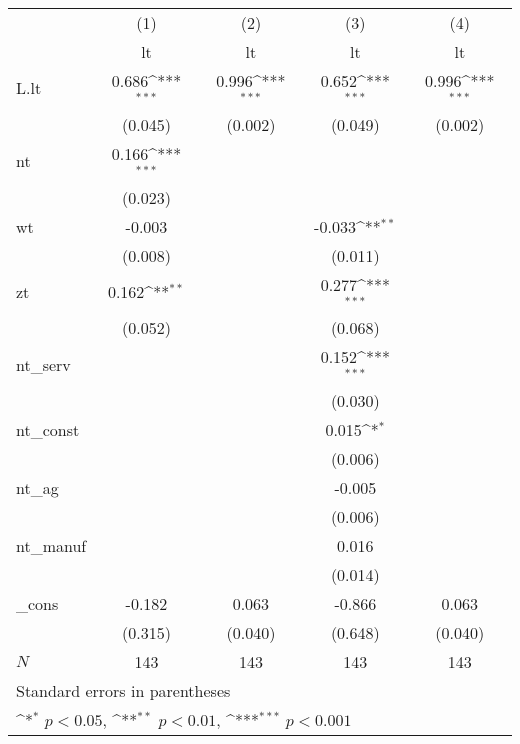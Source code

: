 {
\def\sym#1{\ifmmode^{#1}\else\(^{#1}\)\fi}
\begin{tabular}{l*{4}{c}}
\hline\hline
          &\multicolumn{1}{c}{(1)}&\multicolumn{1}{c}{(2)}&\multicolumn{1}{c}{(3)}&\multicolumn{1}{c}{(4)}\\
          &\multicolumn{1}{c}{lt}&\multicolumn{1}{c}{lt}&\multicolumn{1}{c}{lt}&\multicolumn{1}{c}{lt}\\
\hline
L.lt      &    0.686\sym{***}&    0.996\sym{***}&    0.652\sym{***}&    0.996\sym{***}\\
          &  (0.045)         &  (0.002)         &  (0.049)         &  (0.002)         \\
nt        &    0.166\sym{***}&                  &                  &                  \\
          &  (0.023)         &                  &                  &                  \\
wt        &   -0.003         &                  &   -0.033\sym{**} &                  \\
          &  (0.008)         &                  &  (0.011)         &                  \\
zt        &    0.162\sym{**} &                  &    0.277\sym{***}&                  \\
          &  (0.052)         &                  &  (0.068)         &                  \\
nt\_serv   &                  &                  &    0.152\sym{***}&                  \\
          &                  &                  &  (0.030)         &                  \\
nt\_const  &                  &                  &    0.015\sym{*}  &                  \\
          &                  &                  &  (0.006)         &                  \\
nt\_ag     &                  &                  &   -0.005         &                  \\
          &                  &                  &  (0.006)         &                  \\
nt\_manuf  &                  &                  &    0.016         &                  \\
          &                  &                  &  (0.014)         &                  \\
\_cons    &   -0.182         &    0.063         &   -0.866         &    0.063         \\
          &  (0.315)         &  (0.040)         &  (0.648)         &  (0.040)         \\
\hline
\(N\)     &      143         &      143         &      143         &      143         \\
\hline\hline
\multicolumn{5}{l}{\footnotesize Standard errors in parentheses}\\
\multicolumn{5}{l}{\footnotesize \sym{*} \(p<0.05\), \sym{**} \(p<0.01\), \sym{***} \(p<0.001\)}\\
\end{tabular}
}
